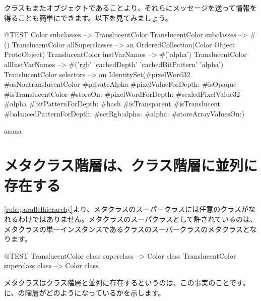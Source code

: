 \documentclass[a4paper,10pt,twoside]{book}
\begin{document}
クラスもまたオブジェクトであることより、それらにメッセージを送って情報を得ることも簡単にできます。以下を見てみましょう。

\begin{code}{@TEST}
Color subclasses                           --> {TranslucentColor}
TranslucentColor subclasses         --> #()
TranslucentColor allSuperclasses  --> an OrderedCollection(Color Object ProtoObject)
TranslucentColor instVarNames     --> #('alpha')
TranslucentColor allInstVarNames --> #('rgb' 'cachedDepth' 'cachedBitPattern' 'alpha')
TranslucentColor selectors             -->  an IdentitySet(#pixelWord32 #asNontranslucentColor #privateAlpha #pixelValueForDepth: #isOpaque #isTranslucentColor #storeOn: #pixelWordForDepth: #scaledPixelValue32 #alpha #bitPatternForDepth: #hash #isTransparent #isTranslucent #balancedPatternForDepth: #setRgb:alpha: #alpha: #storeArrayValuesOn:)
\end{code}


aaaaa



\section{メタクラス階層は、クラス階層に並列に存在する}

\ref{rule:parallelhierarchy}より、メタクラスのスーパークラスには任意のクラスがなれるわけではありません。メタクラスのスーパクラスとして許されているのは、メタクラスの単一インスタンスであるクラスのスーパークラスのメタクラスとなります。

\begin{code}{@TEST}
TranslucentColor class superclass --> Color class
TranslucentColor superclass class --> Color class
\end{code}

\noindent
メタクラスはクラス階層と並列に存在するというのは、この事実のことです。に、の階層がどのようになっているかを示します。
\end{document}
